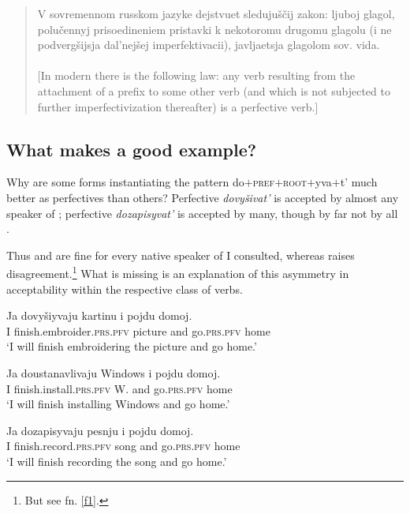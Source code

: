 \documentclass[output=paper,
colorlinks,
citecolor=brown,
newtxmath
]{langscibook}
\begin{document}
\begin{quote}
    V sovremennom russkom jazyke dejstvuet sledujuščij zakon: ljuboj glagol, polučennyj prisoedineniem pristavki k nekotoromu drugomu glagolu (i ne podvergšijsja dal'nejšej imperfektivacii), javljaetsja glagolom sov. vida.\\ \null\hfill\citep[67]{Zaliznjak.Smelev1997}\smallskip\\
    $[$In modern  there is the following law: any verb resulting from the attachment of a prefix to some other verb (and which is not subjected to further imperfectivization thereafter) is a perfective verb.$]$
\end{quote}


\subsection{What makes a good example?}

Why are some forms instantiating the pattern do$+$\textsc{pref}$+$\textsc{root}$+$yva$+$t' much better as perfectives than others? Perfective \textit{dovyšivat'} is accepted by almost any speaker of ; perfective \textit{dozapisyvat'} is accepted by many, though by far not by all
\citep[see][16--17]{Zinova2016}.

Thus  and  are fine for every native speaker of  I consulted, whereas  raises disagreement.\footnote{\label{f2}But see fn. \ref{f1}.} What is missing is an explanation of this asymmetry in acceptability within the respective class of verbs.

\ea\label{Zin6}
\gll Ja dovyšiyvaju kartinu i pojdu domoj.\\
I {finish.embroider.}\textsc{prs.pfv} picture and go.\textsc{prs.pfv} home\\
\glt `I will finish embroidering the picture and go home.'
\z

\ea\label{ustanav}
\gll Ja doustanavlivaju Windows i pojdu domoj.\\
I {finish.install.}\textsc{prs.pfv} W. and go.\textsc{prs.pfv} home\\
\glt `I will finish installing Windows and go home.'
\z

\ea\label{Zin5}
\gll Ja dozapisyvaju pesnju i pojdu domoj.\\
I {finish.record.}\textsc{prs.pfv} song and go.\textsc{prs.pfv} home\\
\glt `I will finish recording the song and go home.'
\z
\end{document}
